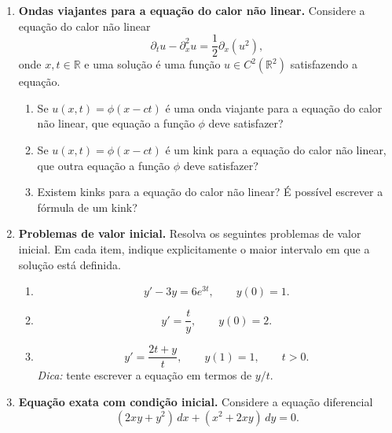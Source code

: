 \documentclass[a4paper,11pt,reqno]{amsart}
\begin{document}
\begin{enumerate}
\begin{enumerate}
    \emph{Dica:} integre a equação obtida no item anterior de $-\infty$ até $x$.

    \item Existem kinks para a equação do calor linear? É possível escrever a fórmula de um kink?
\end{enumerate}


\item \textbf{Ondas viajantes para a equação do calor não linear.}
Considere a equação do calor não linear
\begin{equation}\label{nonlinear-heat-equation}
    \partial_t u-\partial_x^2u=\frac12\partial_x(u^2),
\end{equation}
onde $x,t\in\mathbb{R}$ e uma solução é uma função $u\in C^2(\mathbb{R}^2)$ satisfazendo a equação.

\begin{enumerate}
    \item Se $u(x,t)=\phi(x-ct)$ é uma onda viajante para a equação do calor não linear, que equação a função $\phi$ deve satisfazer?

    \item Se $u(x,t)=\phi(x-ct)$ é um kink para a equação do calor não linear, que outra equação a função $\phi$ deve satisfazer?

    \item Existem kinks para a equação do calor não linear? É possível escrever a fórmula de um kink?
\end{enumerate}


\item \textbf{Problemas de valor inicial.}
Resolva os seguintes problemas de valor inicial. Em cada item, indique explicitamente o maior intervalo em que a solução está definida.

\begin{enumerate}
    \item
    \[
        y'-3y=6e^{3t},
        \qquad
        y(0)=1.
    \]

    \item
    \[
        y'=\frac{t}{y},
        \qquad
        y(0)=2.
    \]

    \item
    \[
        y'=\frac{2t+y}{t},
        \qquad
        y(1)=1,
        \qquad
        t>0.
    \]
    \emph{Dica:} tente escrever a equação em termos de $y/t$.
\end{enumerate}


\item \textbf{Equação exata com condição inicial.}
Considere a equação diferencial
\[
    (2xy+y^2)\,dx+(x^2+2xy)\,dy=0.
\]


\end{enumerate}
\end{document}
